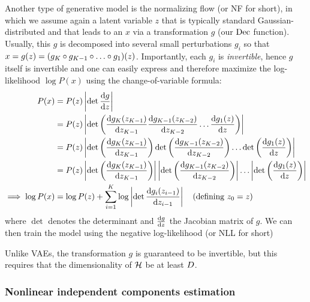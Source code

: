\documentclass[../main.tex]{subfiles}
\begin{document}
Another type of generative model is the normalizing flow (or NF for short), in which we assume again a latent variable $z$ that is typically standard Gaussian-distributed and that leads to an $x$ via a transformation $g$ (our $\operatorname{Dec}$ function).
Usually, this $g$ is decomposed into several small perturbations $g_i$ so that $x = g(z) = (g_K \circ g_{K-1} \circ \ldots \circ g_1) (z)$.
Importantly, each $g_i$ is \emph{invertible}, hence $g$ itself is invertible and one can easily express and therefore maximize the log-likelihood $\log P(x)$ using the change-of-variable formula:
%
\begin{align*}
    P(x)               & = P(z) \left\lvert \det \frac{\mathrm{d} g}{\mathrm{d} z} \right\rvert       \\
                       & = P(z) \left\lvert \det \left(
        \frac{\mathrm{d} g_K(z_{K-1})}{\mathrm{d} z_{K-1}}
        \frac{\mathrm{d} g_{K-1}(z_{K-2})}{\mathrm{d} z_{K-2}}
        \ldots
        \frac{\mathrm{d} g_1(z)}{\mathrm{d} z}
    \right)\right\rvert                                                   \\
                       & = P(z) \left\lvert
        \det \left(
        \frac{\mathrm{d} g_K(z_{K-1})}{\mathrm{d} z_{K-1}}
        \right)
        \det \left(
        \frac{\mathrm{d} g_{K-1}(z_{K-2})}{\mathrm{d} z_{K-2}}
        \right)
        \ldots
        \det \left(
        \frac{\mathrm{d} g_1(z)}{\mathrm{d} z}
        \right)
    \right\rvert                                                          \\
                       & = P(z) \left\lvert
        \det \left(
        \frac{\mathrm{d} g_K(z_{K-1})}{\mathrm{d} z_{K-1}}
        \right)
    \right\rvert
    \left\lvert
        \det \left(
        \frac{\mathrm{d} g_{K-1}(z_{K-2})}{\mathrm{d} z_{K-2}}
        \right)
    \right\rvert
    \ldots
    \left\lvert
        \det \left(
        \frac{\mathrm{d} g_1(z)}{\mathrm{d} z}
        \right)
    \right\rvert                                                          \\
    \implies \log P(x) & = \log P(z) + \sum_{i=1}^K \log \left\lvert
        \det \frac{\mathrm{d} g_i(z_{i-1})}{\mathrm{d} z_{i-1}}
    \right\rvert\quad \text{(defining $z_0 = z$)}
\end{align*}
where $\det$ denotes the determinant and $\frac{\mathrm{d} g}{\mathrm{d} z}$ the Jacobian matrix of $g$.
We can then train the model using the negative log-likelihood (or NLL for short)

Unlike VAEs, the transformation $g$ is guaranteed to be invertible, but this requires that the dimensionality of $\mathcal{H}$ be at least $D$.

\subsubsection{Nonlinear independent components estimation}
\end{document}
